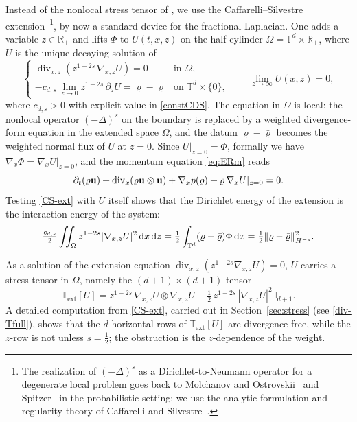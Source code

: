 \documentclass[12pt,a4paper,twoside]{article}
\newcommand{\Div}{\operatorname{div}}
\newcommand{\vr}{\varrho}
\newcommand{\vu}{\vc{u}}
\newcommand{\vc}[1]{{\bf #1}}
\newcommand{\Grad}{\nabla}
\newcommand{\dx}{{\,\rm d} {x}}
\numberwithin{equation}{section}%
\newcommand{\dz}{{\rm d} z}
\begin{document}
	
	Instead of the nonlocal stress tensor of \cite{AlGT2026}, we use the Caffarelli--Silvestre
	extension~\cite{CaS2007}\footnote{The realization of $(-\Delta)^s$ as a Dirichlet-to-Neumann
		operator for a degenerate local problem goes back to Molchanov and Ostrovskii~\cite{MO1969} and
		Spitzer~\cite{S1958} in the probabilistic setting; we use the analytic formulation and
		regularity theory of Caffarelli and Silvestre~\cite{CaS2007}.}, by now a standard device for the
	fractional Laplacian. One adds a variable $z\in\mathbb R_+$ and lifts $\Phi$ to $U(t,x,z)$ on the half-cylinder $\Omega=\mathbb T^d\times\mathbb R_+$, where $U$ is the unique decaying solution of
	\begin{equation}\label{CS-ext}
		\begin{cases}
			\Div_{x,z}\!\left( z^{1-2s}\,\Grad_{x,z} U \right) = 0 & \text{in } \Omega,\\[2pt]
			-c_{d,s}\,\displaystyle\lim_{z\to 0} z^{1-2s}\,\partial_z U = \vr - \bar\vr & \text{on } \mathbb{T}^d\times\{0\},
		\end{cases}
		\qquad \lim_{z\to\infty} U(x,z) = 0,
	\end{equation}
	where $c_{d,s}>0$ with explicit value in \eqref{constCDS}.
	The equation in $\Omega$ is local: the nonlocal operator $(-\Delta)^s$ on the boundary is replaced by a weighted divergence-form equation in the extended space $\Omega$, and the datum $\vr-\bar\vr$ becomes the weighted normal flux of $U$ at $z=0$. Since $U|_{z=0}=\Phi$, formally we have $\Grad_x\Phi=\Grad_x U|_{z=0}$, and the momentum equation \eqref{eq:ERm} reads
	\begin{equation}\label{eq:ERm-ext}
		\partial_t(\vr\vu) + \Div_x(\vr\vu\otimes\vu) + \Grad_x p(\vr) + \vr\,\Grad_x U|_{z=0} = 0 .
	\end{equation}
	Testing \eqref{CS-ext} with $U$ itself shows that the Dirichlet energy of the extension is the interaction energy of the system: 
	\begin{align*}%
		\tfrac{c_{d,s}}2\iint_\Omega z^{1-2s}|\Grad_{x,z}U|^2 \dx \, \dz = \tfrac12\int_{\mathbb T^d}(\vr-\bar\vr)\Phi \dx  = \tfrac12\|\vr-\bar\vr\|_{\dot H^{-s}}^2. 
	\end{align*}
	
	
	As a solution of the extension equation $\Div_{x,z}(z^{1-2s}\Grad_{x,z}U)=0$, $U$ carries a
	stress tensor in $\Omega$, namely the $(d+1)\times(d+1)$ tensor
	\begin{equation}\label{Tfull}
		\mathbb{T}_{\mathrm{ext}}[U] = z^{1-2s}\,\Grad_{x,z} U \otimes \Grad_{x,z} U -
		\tfrac12\, z^{1-2s}\, |\Grad_{x,z} U|^2\, \mathbb{I}_{d+1} .
	\end{equation}
	A detailed computation from \eqref{CS-ext}, carried out in Section~\ref{sec:stress}
	(see \eqref{div-Tfull}), shows that the $d$ horizontal rows of $\mathbb T_{\mathrm{ext}}[U]$
	are divergence-free, while the $z$-row is not unless $s=\tfrac12$; the obstruction is the
	$z$-dependence of the weight.
	
\end{document}
